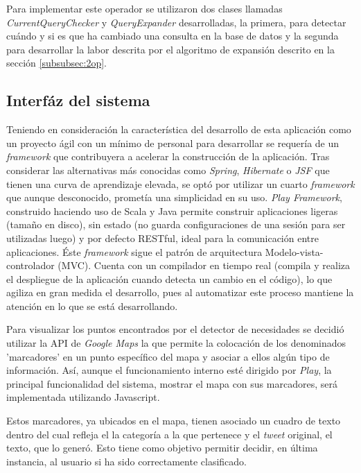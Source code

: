 Para implementar este operador se utilizaron dos clases llamadas \textit{CurrentQueryChecker} y \textit{QueryExpander} desarrolladas, la primera, para detectar cuándo y si es que ha cambiado una consulta en la base de datos y la segunda para desarrollar la labor descrita por el algoritmo de expansión descrito en la sección \ref{subsubsec:2op}.

\subsection{Interfáz del sistema}
\label{sec:diseno:interfaz}

Teniendo en consideración la característica del desarrollo de esta aplicación como un proyecto ágil con un mínimo de personal para desarrollar se requería de un \textit{framework} que contribuyera a acelerar la construcción de la aplicación. Tras considerar las alternativas más conocidas como \textit{Spring}, \textit{Hibernate} o \textit{JSF} que tienen una curva de aprendizaje elevada, se optó por utilizar un cuarto \textit{framework} que aunque desconocido, prometía una simplicidad en su uso. \textit{Play Framework}, construido haciendo uso de Scala y Java permite construir aplicaciones ligeras (tamaño en disco), sin estado (no guarda configuraciones de una sesión para ser utilizadas luego) y por defecto RESTful, ideal para la comunicación entre aplicaciones. Éste \textit{framework} sigue el patrón de arquitectura Modelo-vista-controlador (MVC). Cuenta con un compilador en tiempo real (compila y realiza el despliegue de la aplicación cuando detecta un cambio en el código), lo que agiliza en gran medida el desarrollo, pues al automatizar este proceso mantiene la atención en lo que se está desarrollando.

Para visualizar los puntos encontrados por el detector de necesidades se decidió utilizar la API de \textit{Google Maps} la que permite la colocación de los denominados 'marcadores' en un punto específico del mapa y asociar a ellos algún tipo de información. Así, aunque el funcionamiento interno esté dirigido por \textit{Play}, la principal funcionalidad del sistema, mostrar el mapa con sus marcadores, será implementada utilizando Javascript.

Estos marcadores, ya ubicados en el mapa, tienen asociado un cuadro de texto dentro del cual refleja el la categoría a la que pertenece y el \textit{tweet} original, el texto, que lo generó. Esto tiene como objetivo permitir decidir, en última instancia, al usuario si ha sido correctamente clasificado.

